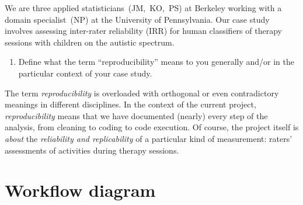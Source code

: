 \documentclass[]{article}
\begin{document}
We are three applied statisticians~(JM,~KO,~PS) at Berkeley working with a
domain specialist~(NP) at the University of Pennsylvania. Our case study
involves assessing inter-rater reliability (IRR) for human classifiers of
therapy sessions with children on the autistic spectrum.

\begin{enumerate}
\def\labelenumi{\arabic{enumi})}
\setcounter{enumi}{1}
\itemsep1pt\parskip0pt
\item
  Define what the term ``reproducibility'' means to you generally and/or
  in the particular context of your case study.
\end{enumerate}

The term \emph{reproducibility} is overloaded with orthogonal or even
contradictory meanings in different disciplines. In the context of the current
project, \emph{reproducibility} means that we have documented (nearly) every
step of the analysis, from cleaning to coding to code execution. Of course, the
project itself is \emph{about} the \emph{reliability and replicability} of a
particular kind of measurement: raters' assessments of activities during
therapy sessions.

\newpage

\section{Workflow diagram}\label{workflow-diagram}

\end{document}
